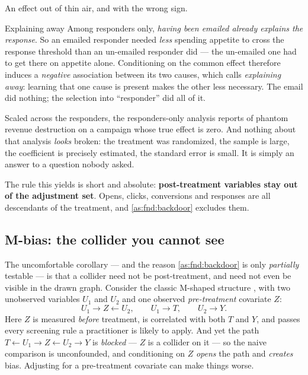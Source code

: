 An effect out of thin air, and with the wrong sign.

\begin{intuition}{Explaining away}
Among responders only, \emph{having been emailed already explains the response}. So an emailed
responder needed \emph{less} spending appetite to cross the response threshold than an
un-emailed responder did --- the un-emailed one had to get there on appetite alone.
Conditioning on the common effect therefore induces a \emph{negative} association between its
two causes, which \citet{pearl2009} calls \emph{explaining away}: learning that one cause is
present makes the other less necessary. The email did nothing; the selection into ``responder''
did all of it.
\end{intuition}



Scaled across the \nbZeroColliderNResp{} responders, the responders-only analysis reports
\eur{\nbZeroColliderPhantom} of phantom revenue destruction on a campaign whose true effect is
zero. And nothing about that analysis \emph{looks} broken: the treatment was randomized, the
sample is large, the coefficient is precisely estimated, the standard error is small. It is
simply an answer to a question nobody asked.

The rule this yields is short and absolute: \textbf{post-treatment variables stay out of the
adjustment set}. Opens, clicks, conversions and responses are all descendants of the treatment,
and \cref{as:fnd:backdoor} excludes them.

\subsection*{M-bias: the collider you cannot see}

The uncomfortable corollary --- and the reason \cref{as:fnd:backdoor} is only \emph{partially}
testable --- is that a collider need not be post-treatment, and need not even be visible in the
drawn graph. Consider the classic M-shaped structure \citep{elwert2014, ding2015}, with two
unobserved variables $U_1$ and $U_2$ and one observed \emph{pre-treatment} covariate $Z$:
%
\begin{equation}
  U_1 \rightarrow Z \leftarrow U_2, \qquad U_1 \rightarrow T, \qquad U_2 \rightarrow Y .
  \label{eq:fnd:mbias}
\end{equation}
%
Here $Z$ is measured \emph{before} treatment, is correlated with both $T$ and $Y$, and passes
every screening rule a practitioner is likely to apply. And yet the path
$T \leftarrow U_1 \rightarrow Z \leftarrow U_2 \rightarrow Y$ is \emph{blocked} --- $Z$ is a
collider on it --- so the naive comparison is unconfounded, and conditioning on $Z$
\emph{opens} the path and \emph{creates} bias. Adjusting for a pre-treatment covariate can make
things worse.

